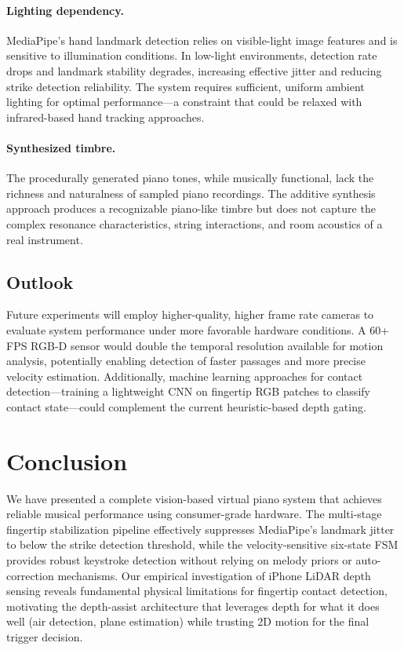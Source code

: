 \documentclass[11pt,a4paper]{article}
\begin{document}
\paragraph{Lighting dependency.}
MediaPipe's hand landmark detection relies on visible-light image features and is sensitive to illumination conditions.
In low-light environments, detection rate drops and landmark stability degrades, increasing effective jitter and reducing strike detection reliability.
The system requires sufficient, uniform ambient lighting for optimal performance---a constraint that could be relaxed with infrared-based hand tracking approaches.

\paragraph{Synthesized timbre.}
The procedurally generated piano tones, while musically functional, lack the richness and naturalness of sampled piano recordings.
The additive synthesis approach produces a recognizable piano-like timbre but does not capture the complex resonance characteristics, string interactions, and room acoustics of a real instrument.

\subsection{Outlook}

Future experiments will employ higher-quality, higher frame rate cameras to evaluate system performance under more favorable hardware conditions.
A 60+ FPS RGB-D sensor would double the temporal resolution available for motion analysis, potentially enabling detection of faster passages and more precise velocity estimation.
Additionally, machine learning approaches for contact detection---training a lightweight CNN on fingertip RGB patches to classify contact state---could complement the current heuristic-based depth gating.

\section{Conclusion}

We have presented a complete vision-based virtual piano system that achieves reliable musical performance using consumer-grade hardware.
The multi-stage fingertip stabilization pipeline effectively suppresses MediaPipe's landmark jitter to below the strike detection threshold, while the velocity-sensitive six-state FSM provides robust keystroke detection without relying on melody priors or auto-correction mechanisms.
Our empirical investigation of iPhone LiDAR depth sensing reveals fundamental physical limitations for fingertip contact detection, motivating the depth-assist architecture that leverages depth for what it does well (air detection, plane estimation) while trusting 2D motion for the final trigger decision.
\end{document}
